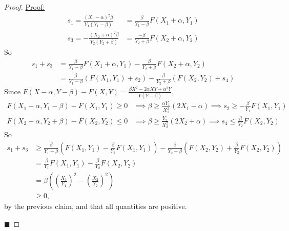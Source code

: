 \documentclass{article}
\theoremstyle{case}
\newenvironment{claim}[1]{\par\noindent\underline{Claim:}\space#1}{}
\newenvironment{claimproof}[1]{\par\noindent\underline{Proof:}\space#1}{\hfill $\blacksquare$}
\begin{document}
\begin{proof}
\begin{claimproof}
\begin{align*}
s_1 = \frac{\left( X_1 - \alpha \right)^2\beta }{Y_1\left( Y_1 - \beta\right)} & = \frac{\beta}{Y_1-\beta}F(X_1+\alpha, Y_1) \\
s_3 = -\frac{\left( X_2 + \alpha \right)^2 \beta }{Y_2\left( Y_2+\beta\right) } & = \frac{-\beta}{Y_2 + \beta}F(X_2+\alpha, Y_2)
\end{align*}
So
\begin{align*}
s_1 + s_3 & = \frac{\beta}{Y_1-\beta}F(X_1+\alpha, Y_1) - \frac{\beta}{Y_2 + \beta}F(X_2+\alpha, Y_2) \\
& = \frac{\beta}{Y_1 - \beta}\left( F(X_1, Y_1) + s_2\right) - \frac{\beta}{Y_2 + \beta}\left( F(X_2,Y_2) + s_4\right)
\end{align*}
Since $F(X - \alpha, Y - \beta) - F(X, Y) = \frac{\beta X^2 - 2\alpha XY + \alpha^2 Y}{Y\left( Y-\beta\right)}$, 
\begin{align*}
F(X_1 - \alpha, Y_1 - \beta) - F(X_1, Y_1) \geq 0 & \implies \beta \geq \frac{\alpha Y_1}{X_1^2}\left( 2X_1 - \alpha \right) \implies s_2 \geq -\frac{\beta}{Y_1}F(X_1, Y_1) \\
F(X_2+\alpha, Y_2+\beta) - F(X_2, Y_2) \leq 0 & \implies \beta \geq \frac{Y_2}{X_2^2}\left( 2X_2 + \alpha \right) \implies s_4 \leq \frac{\beta}{Y_2}F(X_2, Y_2)
\end{align*}
So 
\begin{align*}
s_1 + s_3 & \geq \frac{\beta}{Y_1 - \beta}\left( F(X_1, Y_1) - \frac{\beta}{Y_1}F(X_1, Y_1)\right) - \frac{\beta}{Y_2+\beta}\left( F(X_2, Y_2) + \frac{\beta}{Y_2}F(X_2, Y_2)\right) \\
& = \frac{\beta}{Y_1}F(X_1, Y_1) - \frac{\beta}{Y_2}F(X_2, Y_2) \\
& = \beta \left( \left( \frac{X_1}{Y_1}\right)^2 - \left( \frac{X_2}{Y_2}\right)^2 \right) \\
& \geq 0,
\end{align*}
by the previous claim, and that all quantities are positive.


\end{claimproof}
\end{proof}
\end{document}
